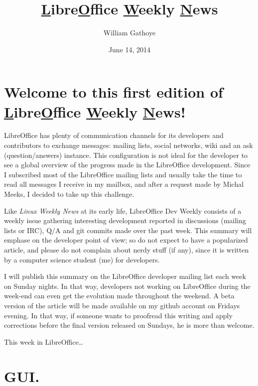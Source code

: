 \documentclass{article}
\begin{document}
\title{\underline{L}ibre\underline{O}ffice \underline{W}eekly \underline{N}ews}
\author{William Gathoye}
\date{June 14, 2014}
\maketitle



\section{Welcome to this first edition of \underline{L}ibre\underline{O}ffice
\underline{W}eekly \underline{N}ews!}

LibreOffice has plenty of communication channels for its developers and
contributors to exchange messages: mailing lists, social networks, wiki and an
ask (question/answers) instance. This configuration is not ideal for the
developer to see a global overview of the progress made in the LibreOffice
development. Since I subscribed most of the LibreOffice mailing lists and
usually take the time to read all messages I receive in my mailbox, and after
a request made by Michal Meeks, I decided to take up this challenge.

Like \emph{Linux Weekly News} at its early life, LibreOffice Dev Weekly
consists of a weekly issue gathering interesting development reported in
discussions (mailing lists or IRC), Q/A and git commits made over the past
week. This summary will emphase on the developer point of view; so do not
expect to have a popularized article, and please do not complain about nerdy
stuff (if any), since it is written by a computer science student (me) for
developers. 

I will publish this summary on the LibreOffice developer mailing list each week
on Sunday nights. In that way, developers not working on LibreOffice during the
week-end can even get the evolution made throughout the weekend. A beta version
of the article will be made available on my github account\cite{wgetGithub} on
Fridays evening. In that way, if someone wants to proofread this writing and
apply corrections before the final version released on Sundays, he is more than
welcome.

This week in LibreOffice\ldots



\section{GUI.}
\end{document}
